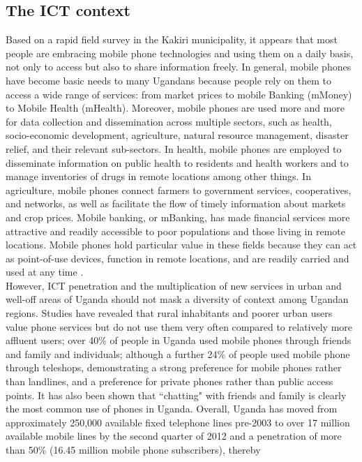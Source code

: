 \documentclass[11pt]{article}
\begin{document}
\subsection{The ICT context}
Based on a rapid field survey in the Kakiri municipality, it appears that most people are embracing mobile phone technologies and using them on a daily basis, not only to access but also to share information freely. In general, mobile phones have become basic needs to many Ugandans because people rely on them to access a wide range of services: from market prices to mobile Banking (mMoney) to Mobile Health (mHealth).
Moreover, mobile phones are used more and more for data collection and dissemination across multiple sectors, such as health, socio-economic development, agriculture, natural resource management, disaster relief, and their relevant sub-sectors. In health, mobile phones are employed to disseminate information on public health to residents and health workers and to manage inventories of drugs in remote locations among other things. In agriculture, mobile phones connect farmers to government services, cooperatives, and networks, as well as facilitate the flow of timely information about markets and crop prices. Mobile banking, or mBanking, has made financial services more attractive and readily accessible to poor populations and those living in remote locations\cite{Rikke10}. Mobile phones hold particular value in these fields because they can act as point-of-use devices, function in remote locations, and are readily carried and used at any time \cite{Kimberly11}\cite{Rikke10}.
\\
However, ICT penetration and the multiplication of new services in urban and well-off areas of Uganda should not mask a diversity of context among Ugandan regions. Studies have revealed that rural inhabitants and poorer urban users value phone services but do not use them very often compared to relatively more affluent users; over 40\% of people in Uganda used mobile phones through friends and family and individuals; although a further 24\% of people used mobile phone through teleshops, demonstrating a strong preference for mobile phones rather than landlines, and a preference for private phones rather than public access points. It has also been shown that ``chatting" with friends and family is clearly the most common use of phones in Uganda\cite{ Scott04}. Overall, Uganda has moved from approximately 250,000 available fixed telephone lines pre-2003 to over 17 million available mobile lines by the second quarter of 2012 and a penetration of more than 50\% (16.45 million mobile phone subscribers), thereby 
\end{document}

